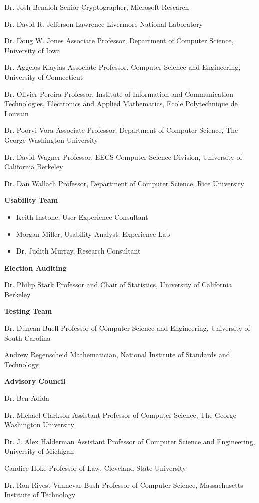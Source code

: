 Dr. Josh Benaloh
Senior Cryptographer, Microsoft Research
 
Dr. David R. Jefferson
Lawrence Livermore National Laboratory
 
Dr. Doug W. Jones
Associate Professor, Department of Computer Science, University of Iowa
 
Dr. Aggelos Kiayias
Associate Professor, Computer Science and Engineering, University of Connecticut
 
Dr. Olivier Pereira
Professor, Institute of Information and Communication Technologies, Electronics and Applied Mathematics, Ecole Polytechnique de Louvain
 
Dr. Poorvi Vora
Associate Professor, Department of Computer Science, The George Washington University
 
Dr. David Wagner
Professor, EECS Computer Science Division, University of California Berkeley
 
Dr. Dan Wallach
Professor, Department of Computer Science, Rice University
 
\textbf{Usability Team}

\begin{itemize}
\item Keith Instone, User Experience Consultant
\item Morgan Miller, Usability Analyst, Experience Lab
\item Dr. Judith Murray, Research Consultant
\end{itemize}

\textbf{Election Auditing}

Dr. Philip Stark
Professor and Chair of Statistics, University of California Berkeley
 
\textbf{Testing Team}

Dr. Duncan Buell
Professor of Computer Science and Engineering, University of South Carolina
 
Andrew Regenscheid
Mathematician, National Institute of Standards and Technology
 
\textbf{Advisory Council}

Dr. Ben Adida
 
Dr. Michael Clarkson
Assistant Professor of Computer Science, The George Washington University
 
Dr. J. Alex Halderman
Assistant Professor of Computer Science and Engineering, University of Michigan
 
Candice Hoke
Professor of Law, Cleveland State University
 
Dr. Ron Rivest
Vannevar Bush Professor of Computer Science, Massachusetts Institute of Technology
 
